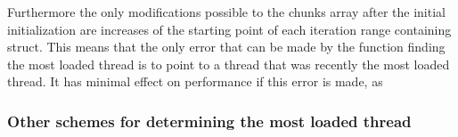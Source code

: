 \documentclass[11pt,a4paper]{article}
\begin{document}
Furthermore the only modifications possible to the chunks array after the initial initialization are increases of the starting point of each iteration range containing struct. 
This means that the only error that can be made by the function finding the most loaded thread is to point to a thread that was recently the most loaded thread. 
It has minimal effect on performance if this error is made, as 

\subsubsection{Other schemes for determining the most loaded thread}

\label{sec:most_loaded}
\end{document}
